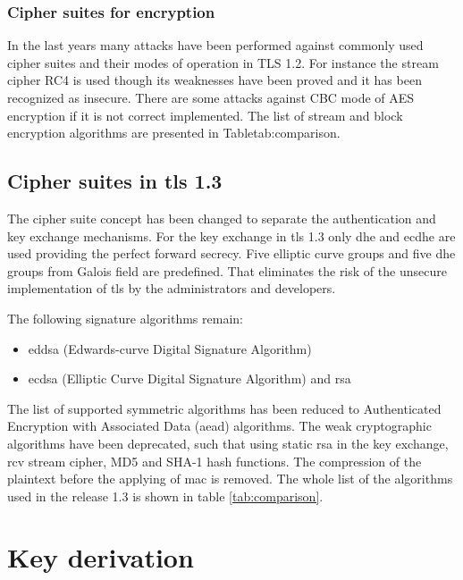\subsubsection*{Cipher suites for encryption}

In the last years many attacks have been performed against commonly used cipher suites and their modes of operation in TLS 1.2. For instance the stream cipher RC4 is used though its weaknesses have been proved and it has been recognized as insecure. There are some attacks against CBC mode of AES encryption if it is not correct implemented.
The list of stream and block encryption algorithms are presented in Table{tab:comparison}.


\subsection{Cipher suites in \gls{tls} 1.3}
\label{subsec:ciphersuits1_3}

The cipher suite concept has been changed to separate the authentication and key exchange mechanisms.
For the key exchange in \gls{tls} 1.3 only \gls{dhe} and \gls{ecdhe} are used providing the perfect forward secrecy. Five elliptic curve groups and five \gls{dhe} groups from Galois field are predefined. That eliminates the risk of the unsecure implementation of \gls{tls} by the administrators and developers.

The following signature algorithms remain: 
\begin{itemize}
	\item \gls{eddsa} (Edwards-curve Digital Signature Algorithm)
	\item \gls{ecdsa} (Elliptic Curve Digital Signature Algorithm) and \gls{rsa}
\end{itemize}

The list of supported symmetric algorithms has been reduced to Authenticated Encryption with Associated Data (\gls{aead}) algorithms.
The weak cryptographic algorithms have been deprecated, such that using static \gls{rsa} in the key exchange, \gls{rcv} stream cipher, MD5 and SHA-1 hash functions. The compression of the plaintext before the applying of \gls{mac} is removed.
The whole list of the algorithms used in the release 1.3 is shown in table \ref{tab:comparison}.
\cite{recorla}
\section{Key derivation}
\label{sec:comparison_kdf}

